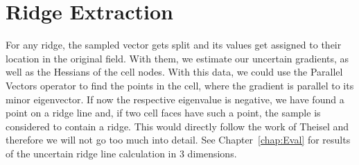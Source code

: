 \section{Ridge Extraction}\label{sec:ridgeextract}

For any ridge, the sampled vector gets split and its values get assigned
to their location in the original field. With them, we estimate our
uncertain gradients, as well as the Hessians of the cell nodes. With
this data, we could use the Parallel Vectors operator to find the points
in the cell, where the gradient is parallel to its minor eigenvector. If
now the respective eigenvalue is negative, we have found a point on a
ridge line and, if two cell faces have such a point, the sample is
considered to contain a ridge. This would directly follow the work of
Theisel \etal{} and therefore we will not go too much into detail. See
Chapter~\ref{chap:Eval} for results of the uncertain ridge line
calculation in 3 dimensions.\\
